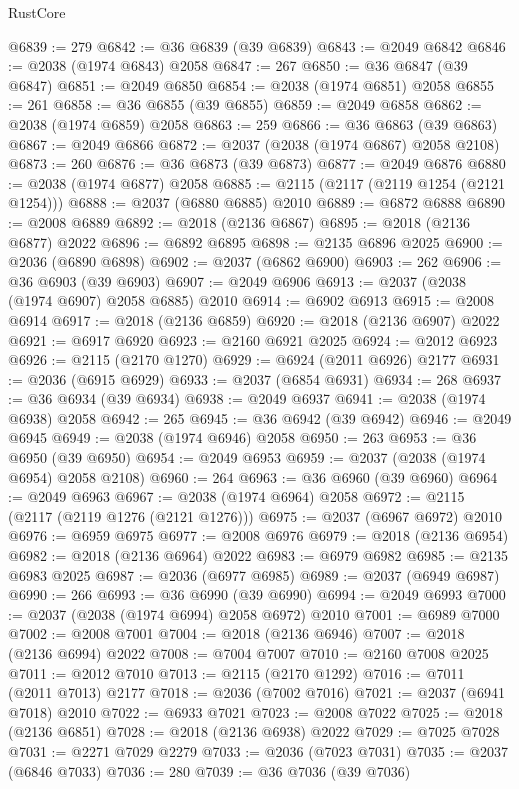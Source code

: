 \begin{lexlean}{RustCore}
\begin{coremodule}
@6839 := 279
@6842 := @36 @6839 (@39 @6839)
@6843 := @2049 @6842
@6846 := @2038 (@1974 @6843) @2058
@6847 := 267
@6850 := @36 @6847 (@39 @6847)
@6851 := @2049 @6850
@6854 := @2038 (@1974 @6851) @2058
@6855 := 261
@6858 := @36 @6855 (@39 @6855)
@6859 := @2049 @6858
@6862 := @2038 (@1974 @6859) @2058
@6863 := 259
@6866 := @36 @6863 (@39 @6863)
@6867 := @2049 @6866
@6872 := @2037 (@2038 (@1974 @6867) @2058 @2108)
@6873 := 260
@6876 := @36 @6873 (@39 @6873)
@6877 := @2049 @6876
@6880 := @2038 (@1974 @6877) @2058
@6885 := @2115 (@2117 (@2119 @1254 (@2121 @1254)))
@6888 := @2037 (@6880 @6885) @2010
@6889 := @6872 @6888
@6890 := @2008 @6889
@6892 := @2018 (@2136 @6867)
@6895 := @2018 (@2136 @6877) @2022
@6896 := @6892 @6895
@6898 := @2135 @6896 @2025
@6900 := @2036 (@6890 @6898)
@6902 := @2037 (@6862 @6900)
@6903 := 262
@6906 := @36 @6903 (@39 @6903)
@6907 := @2049 @6906
@6913 := @2037 (@2038 (@1974 @6907) @2058 @6885) @2010
@6914 := @6902 @6913
@6915 := @2008 @6914
@6917 := @2018 (@2136 @6859)
@6920 := @2018 (@2136 @6907) @2022
@6921 := @6917 @6920
@6923 := @2160 @6921 @2025
@6924 := @2012 @6923
@6926 := @2115 (@2170 @1270)
@6929 := @6924 (@2011 @6926) @2177
@6931 := @2036 (@6915 @6929)
@6933 := @2037 (@6854 @6931)
@6934 := 268
@6937 := @36 @6934 (@39 @6934)
@6938 := @2049 @6937
@6941 := @2038 (@1974 @6938) @2058
@6942 := 265
@6945 := @36 @6942 (@39 @6942)
@6946 := @2049 @6945
@6949 := @2038 (@1974 @6946) @2058
@6950 := 263
@6953 := @36 @6950 (@39 @6950)
@6954 := @2049 @6953
@6959 := @2037 (@2038 (@1974 @6954) @2058 @2108)
@6960 := 264
@6963 := @36 @6960 (@39 @6960)
@6964 := @2049 @6963
@6967 := @2038 (@1974 @6964) @2058
@6972 := @2115 (@2117 (@2119 @1276 (@2121 @1276)))
@6975 := @2037 (@6967 @6972) @2010
@6976 := @6959 @6975
@6977 := @2008 @6976
@6979 := @2018 (@2136 @6954)
@6982 := @2018 (@2136 @6964) @2022
@6983 := @6979 @6982
@6985 := @2135 @6983 @2025
@6987 := @2036 (@6977 @6985)
@6989 := @2037 (@6949 @6987)
@6990 := 266
@6993 := @36 @6990 (@39 @6990)
@6994 := @2049 @6993
@7000 := @2037 (@2038 (@1974 @6994) @2058 @6972) @2010
@7001 := @6989 @7000
@7002 := @2008 @7001
@7004 := @2018 (@2136 @6946)
@7007 := @2018 (@2136 @6994) @2022
@7008 := @7004 @7007
@7010 := @2160 @7008 @2025
@7011 := @2012 @7010
@7013 := @2115 (@2170 @1292)
@7016 := @7011 (@2011 @7013) @2177
@7018 := @2036 (@7002 @7016)
@7021 := @2037 (@6941 @7018) @2010
@7022 := @6933 @7021
@7023 := @2008 @7022
@7025 := @2018 (@2136 @6851)
@7028 := @2018 (@2136 @6938) @2022
@7029 := @7025 @7028
@7031 := @2271 @7029 @2279
@7033 := @2036 (@7023 @7031)
@7035 := @2037 (@6846 @7033)
@7036 := 280
@7039 := @36 @7036 (@39 @7036)

\end{coremodule}
\end{lexlean}
